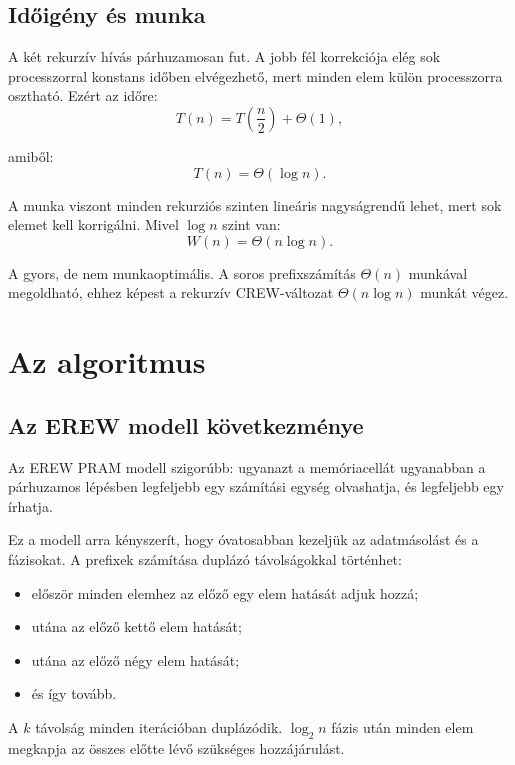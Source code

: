 \subsection{Időigény és munka}

A két rekurzív hívás párhuzamosan fut. A jobb fél korrekciója elég sok processzorral konstans időben elvégezhető, mert minden elem külön processzorra osztható. Ezért az időre:
\[
  T(n)=T\left(\frac{n}{2}\right)+\Theta(1),
\]

amiből:
\[
  T(n)=\Theta(\log n).
\]

A munka viszont minden rekurziós szinten lineáris nagyságrendű lehet, mert sok elemet kell korrigálni. Mivel $\log n$ szint van:
\[
  W(n)=\Theta(n\log n).
\]

\begin{warningbox}
A  gyors, de nem munkaoptimális. A soros prefixszámítás $\Theta(n)$ munkával megoldható, ehhez képest a rekurzív CREW-változat $\Theta(n\log n)$ munkát végez.
\end{warningbox}

\section{Az  algoritmus}

\subsection{Az EREW modell következménye}

Az EREW PRAM modell szigorúbb: ugyanazt a memóriacellát ugyanabban a párhuzamos lépésben legfeljebb egy számítási egység olvashatja, és legfeljebb egy írhatja.

Ez a modell arra kényszerít, hogy óvatosabban kezeljük az adatmásolást és a fázisokat. A prefixek számítása duplázó távolságokkal történhet:

\begin{itemize}
  \item először minden elemhez az előző egy elem hatását adjuk hozzá;
  \item utána az előző kettő elem hatását;
  \item utána az előző négy elem hatását;
  \item és így tovább.
\end{itemize}

A $k$ távolság minden iterációban duplázódik. $\log_2 n$ fázis után minden elem megkapja az összes előtte lévő szükséges hozzájárulást.

